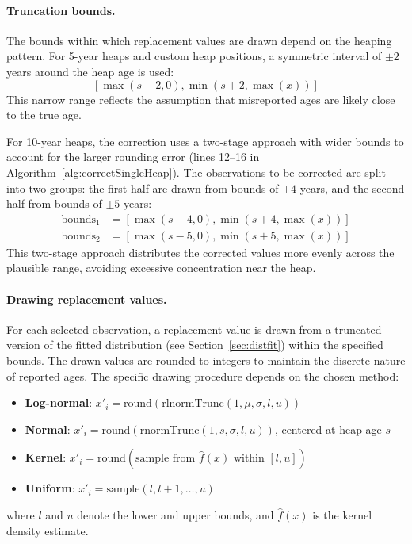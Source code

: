 \documentclass[pdflatex,sn-mathphys-num]{sn-jnl}%
\theoremstyle{thmstyleone}%
\theoremstyle{thmstyletwo}%
\theoremstyle{thmstylethree}%
\begin{document}
\paragraph{Truncation bounds.}
The bounds within which replacement values are drawn depend on the heaping pattern. For 5-year heaps and custom heap positions, a symmetric interval of $\pm 2$ years around the heap age is used:
\[
[\max(s - 2, 0), \min(s + 2, \max(x))]
\]
This narrow range reflects the assumption that misreported ages are likely close to the true age.

For 10-year heaps, the correction uses a two-stage approach with wider bounds to account for the larger rounding error (lines 12--16 in Algorithm~\ref{alg:correctSingleHeap}). The observations to be corrected are split into two groups: the first half are drawn from bounds of $\pm 4$ years, and the second half from bounds of $\pm 5$ years:
\begin{align}
\text{bounds}_1 &= [\max(s - 4, 0), \min(s + 4, \max(x))] \\
\text{bounds}_2 &= [\max(s - 5, 0), \min(s + 5, \max(x))]
\end{align}
This two-stage approach distributes the corrected values more evenly across the plausible range, avoiding excessive concentration near the heap.

\paragraph{Drawing replacement values.}
For each selected observation, a replacement value is drawn from a truncated version of the fitted distribution (see Section~\ref{sec:distfit}) within the specified bounds. The drawn values are rounded to integers to maintain the discrete nature of reported ages. The specific drawing procedure depends on the chosen method:
\begin{itemize}
\item \textbf{Log-normal}: $x'_i = \text{round}(\text{rlnormTrunc}(1, \mu, \sigma, l, u))$
\item \textbf{Normal}: $x'_i = \text{round}(\text{rnormTrunc}(1, s, \sigma, l, u))$, centered at heap age $s$
\item \textbf{Kernel}: $x'_i = \text{round}(\text{sample from } \hat{f}(x) \text{ within } [l, u])$
\item \textbf{Uniform}: $x'_i = \text{sample}(l, l{+}1, \ldots, u)$
\end{itemize}
where $l$ and $u$ denote the lower and upper bounds, and $\hat{f}(x)$ is the kernel density estimate.
\end{document}
